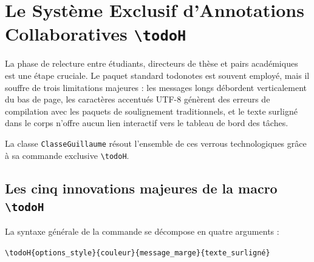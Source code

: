 \section{Le Système Exclusif d'Annotations Collaboratives \texttt{\textbackslash todoH}}
\label{sec:systeme_todoh}

La phase de relecture entre étudiants, directeurs de thèse et pairs académiques est une étape cruciale.
Le paquet standard \textsf{todonotes} est souvent employé, mais il souffre de trois limitations majeures :
les messages longs débordent verticalement du bas de page, les caractères accentués UTF-8 génèrent des erreurs de compilation avec les paquets de soulignement traditionnels, et le texte surligné dans le corps n'offre aucun lien interactif vers le tableau de bord des tâches.

La classe \texttt{ClasseGuillaume} résout l'ensemble de ces verrous technologiques grâce à sa commande exclusive \texttt{\textbackslash todoH}.

\subsection{Les cinq innovations majeures de la macro \texttt{\textbackslash todoH}}
\label{subsec:cinq_innovations_todoh}

La syntaxe générale de la commande se décompose en quatre arguments :
\begin{center}
  \texttt{\textbackslash todoH\{options\_style\}\{couleur\}\{message\_marge\}\{texte\_surligné\}}
\end{center}

